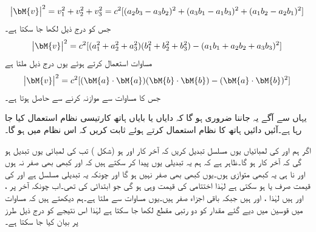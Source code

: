 \begin{align*}
\abs{\bM{v}}^2=v_1^2+v_2^2+v_3^2=c^2[(a_2b_3-a_3b_2)^2+(a_3b_1-a_1b_3)^2+(a_1b_2-a_2b_1)^2]
\end{align*}
جس کو درج ذیل لکھا جا سکتا ہے۔
\begin{align*}
\abs{\bM{v}}^2=c^2[(a_1^2+a_2^2+a_3^2)(b_1^2+b_2^2+b_3^2)-(a_1b_1+a_2b_2+a_3b_3)^2]
\end{align*}
مساوات  استعمال کرتے ہوئے یوں درج ذیل ملتا ہے
\begin{align*}
\abs{\bM{v}}^2=c^2[(\bM{a}\cdot\bM{a})(\bM{b}\cdot\bM{b})-(\bM{a}\cdot\bM{b})^2]
\end{align*}
جس کا مساوات  سے موازنہ کرنے سے  حاصل ہوتا ہے۔

یہاں سے آگے یہ جاننا ضروری ہو گا کہ دایاں یا بایاں ہاتھ کارتیسی نظام استعمال کیا جا رہا ہے۔آئیں دائیں ہاتھ کا نظام استعمال کرتے ہوئے ثابت کریں کہ اس نظام میں  ہو گا۔

اگر ہم  اور  کی لمبائیاں یوں مسلسل تبدیل کریں کہ آخر کار  اور  ہو (شکل ) تب  کی لمبائی یوں تبدیل ہو گی کہ آخر کار  ہو گا۔ظاہر ہے کہ ہم یہ تبدیلی یوں پیدا کر سکتے ہیں کہ  اور  کبھی بھی صفر نہ ہوں اور نا ہی یہ کبھی متوازی ہوں۔یوں  کبھی بھی صفر نہیں ہو گا اور چونکہ یہ تبدیلی مسلسل ہے اور  کی قیمت صرف  یا  ہو سکتی ہے لہٰذا اختتامی  کی قیمت وہی ہو گی جو ابتدائی  کی تھی۔اب چونکہ آخر پر ،  اور  ہیں لہٰذا ،  اور  ہیں جبکہ باقی اجزاء صفر ہیں۔یوں مساوات  سے  ملتا ہے۔ہم دیکھتے ہیں کہ مساوات  میں قوسین میں دیے گئے مقدار کو دو رتبی مقطع لکھا جا سکتا ہے لہٰذا اس نتیجے کو درج ذیل طرز پر بیان کیا جا سکتا ہے۔


